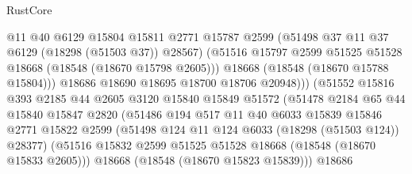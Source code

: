 \begin{lexlean}{RustCore}
\begin{coremodule}
                                  @11
                                  @40
                                  @6129
                                  @15804
                                  @15811
                                  @2771
                                  @15787
                                  @2599
                                  (@51498 @37 @11 @37 @6129 (@18298 (@51503 @37)) @28567)
                                  (@51516
                                    @15797
                                    @2599
                                    @51525
                                    @51528
                                    @18668
                                    (@18548 (@18670 @15798 @2605)))
                                  @18668
                                  (@18548 (@18670 @15788 @15804)))
                                @18686
                                @18690
                                @18695
                                @18700
                                @18706
                                @20948)))
                          (@51552
                            @15816
                            @393
                            @2185
                            @44
                            @2605
                            @3120
                            @15840
                            @15849
                            @51572
                            (@51478
                              @2184
                              @65
                              @44
                              @15840
                              @15847
                              @2820
                              (@51486
                                @194
                                @517
                                @11
                                @40
                                @6033
                                @15839
                                @15846
                                @2771
                                @15822
                                @2599
                                (@51498 @124 @11 @124 @6033 (@18298 (@51503 @124)) @28377)
                                (@51516
                                  @15832
                                  @2599
                                  @51525
                                  @51528
                                  @18668
                                  (@18548 (@18670 @15833 @2605)))
                                @18668
                                (@18548 (@18670 @15823 @15839)))
                              @18686

\end{coremodule}
\end{lexlean}
